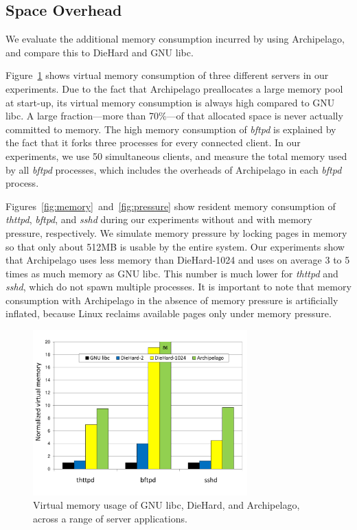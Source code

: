 \documentclass{acm_proc_article-sp}
\begin{document}
\subsection{Space Overhead}


\label{sec:eval-memory}

\noindent
We evaluate the additional memory consumption incurred by using
Archipelago, and compare this to DieHard and GNU libc.

Figure~\ref{fig:virtual} shows virtual memory consumption of three
different servers in our experiments. Due to the fact that Archipelago
preallocates a large memory pool at start-up, its virtual memory
consumption is always high compared to GNU libc. A large
fraction---more than 70\%---of that allocated space is never actually
committed to memory. The high memory consumption of \emph{bftpd} is
explained by the fact that it forks three processes for every
connected client. In our experiments, we use 50 simultaneous clients,
and measure the total memory used by all \emph{bftpd} processes, which
includes the overheads of Archipelago in each \emph{bftpd} process.

Figures~\ref{fig:memory}~and~\ref{fig:pressure} show resident memory
consumption of \emph{thttpd}, \emph{bftpd}, and \emph{sshd} during our
experiments without and with memory pressure, respectively. We
simulate memory pressure by locking pages in memory so that only about
512MB is usable by the entire system. Our experiments show that
Archipelago uses less memory than DieHard-1024 and uses on average 3
to 5 times as much memory as GNU libc. This number is much lower for
\emph{thttpd} and \emph{sshd}, which do not spawn multiple
processes. It is important to note that memory consumption with
Archipelago in the absence of memory pressure is artificially inflated,
because Linux reclaims available pages only under memory pressure.

\begin{figure}[t]
 \centering
 \includegraphics[width=3.25in]{vm-usage.pdf}
 \caption{Virtual memory usage of GNU libc, DieHard, and Archipelago, across a range of server applications.}
 \label{fig:virtual}
\end{figure}
\end{document}
